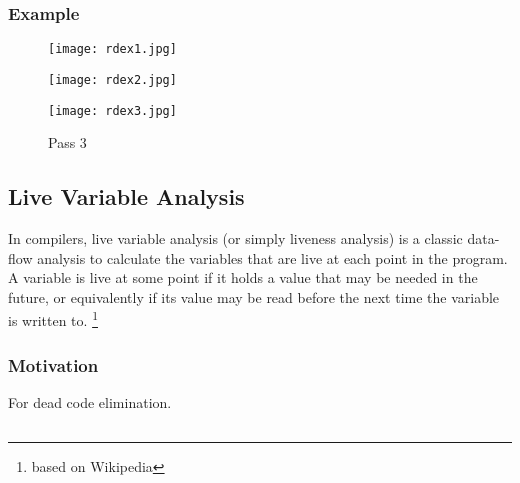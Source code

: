 \subsubsection{Example}


\begin{figure}[!htb]
      \texttt{[image: rdex1.jpg]}
      \caption{Pass 1}\label{fig:awesome_image1}
    \endminipage\hfill
      \texttt{[image: rdex2.jpg]}
      \caption{Pass 2}\label{fig:awesome_image2}
    \endminipage\hfill
      \texttt{[image: rdex3.jpg]}
      \caption{Pass 3}\label{fig:awesome_image3}
    \endminipage
\end{figure}



\subsection{ Live    Variable    Analysis   }

In compilers, live variable analysis (or simply liveness analysis)
 is a classic data-flow analysis to calculate the variables that 
 are live at each point in the program. A variable is live at 
 some point if it holds a value that may be needed in the future, 
 or equivalently if its value may be read before the next time 
 the variable is written to. \footnote{based on Wikipedia}

\subsubsection{Motivation}


For dead code elimination.
\subsection{}

